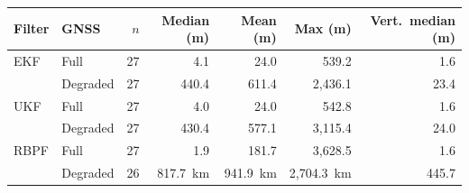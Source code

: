 \begin{tabular}{llrrrrr}
\toprule
Filter & GNSS & \(n\) & Median (m) & Mean (m) & Max (m) & Vert.\ median (m) \\
\midrule
EKF & Full & 27 & 4.1 & 24.0 & 539.2 & 1.6 \\
 & Degraded & 27 & 440.4 & 611.4 & 2{,}436.1 & 23.4 \\
\midrule
UKF & Full & 27 & 4.0 & 24.0 & 542.8 & 1.6 \\
 & Degraded & 27 & 430.4 & 577.1 & 3{,}115.4 & 24.0 \\
\midrule
RBPF & Full & 27 & 1.9 & 181.7 & 3{,}628.5 & 1.6 \\
 & Degraded & 26 & 817.7~km & 941.9~km & 2{,}704.3~km & 445.7 \\
\bottomrule
\end{tabular}

